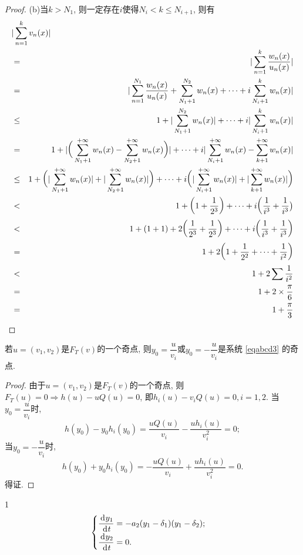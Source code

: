 \documentclass[a4paper,12pt,twoside]{ctexart}
\begin{document}
\begin{proof}
(b)当$k>N_1$, 则一定存在$i$使得$N_i<k\leq N_{i+1}$, 则有\\
\begin{eqnarray*}
\lefteqn{\vert\sum_{n=1}^{k}v_n(x)\vert}\\
&=&\vert\sum_{n=1}^k\frac{w_n(x)}{u_n(x)}\vert\\
&=&\vert\sum_{n=1}^{N_1}\frac{w_n(x)}{u_n(x)} +\sum_{N_1+1}^{N_2}w_n(x)+\dots+i\sum_{N_i+1}^kw_n(x)\vert\\
&\le&1+\vert\sum_{N_1+1}^{N_2}w_n(x)\vert+\dots +i\vert\sum_{N_i+1}^kw_n(x)\vert\\
&=&1+\vert\bigg(\sum_{N_1+1}^{+\infty}w_n(x) -\sum_{N_2+1}^{+\infty}w_n(x)\bigg)\vert +\dots +i\vert\sum_{N_i+1}^{+\infty}w_n(x)-\sum_{k+1}^{+\infty}w_n(x)\vert\\
&\le&1+\bigg(\vert\sum_{N_1+1}^{+\infty}w_n(x)\vert+ \vert\sum_{N_2+1}^{+\infty}w_n(x)\vert\bigg)+\dots +i\bigg(\vert\sum_{N_i+1}^{+\infty}w_n(x)\vert +\vert\sum_{k+1}^{+\infty}w_n(x)\vert\bigg)\\
&<&1+\bigg(1+\frac1{2^3}\bigg)+\dots+i\bigg(\frac1{i^3}+\frac1{i^3}\big)\\
&<&1+(1+1)+2\bigg(\frac1{2^3}+\frac1{2^3}\bigg)+\dots +i\bigg(\frac1{i^3}+\frac1{i^3}\bigg)\\
&=&1+2\bigg(1+\frac{1}{2^2}+\dots+\frac{1}{i^2}\bigg)\\
&<&1+2\sum\frac{1}{i^2}\\
&=&1+2\times\frac\pi6\\
&=&1+\frac\pi3
\end{eqnarray*}
\end{proof}


\begin{lem}\label{lem8}
    若$u=(v_1, v_2)$是$F_T(v)$的一个奇点, 则$y_0=\dfrac{u}{v_i}$或$y_0=-\dfrac{u}{v_i}$是系统
    \eqref{eqabcd3} 的奇点.
    \end{lem}

    \begin{proof}
    由于$u=(v_1, v_2)$是$F_T(v)$的一个奇点, 则$F_T(u)=0 \Rightarrow h(u)-uQ(u)=0$, 即$h_i(u)-v_i Q(u)=0, i=1, 2$.
    \noindent 当$y_0=\dfrac{u}{v_i}$时,
        $$h(y_0)-y_0 h_i(y_0)=\dfrac{uQ(u)}{v_i}-\dfrac{u h_i(u)}{v_i^2}=0;$$
    当$y_0=-\dfrac{u}{v_i}$时,
        $$h(y_0)+y_0 h_i(y_0)=-\dfrac{uQ(u)}{v_i}+\dfrac{u h_i(u)}{v_i^2}=0.$$
    得证.
    \end{proof}

\begin{spacing}{1}
$$\begin{cases}
    \dfrac{{\,\textup{d}}^{}y_1}{{\,\textup{d}}^{}t}=-a_2(y_1-\delta_1)(y_1-\delta_2);\\[5pt]
    \dfrac{{\,\textup{d}}^{}y_2}{{\,\textup{d}}^{}t}=0.
    \end{cases}$$
\end{spacing}\bigskip
\end{document}
